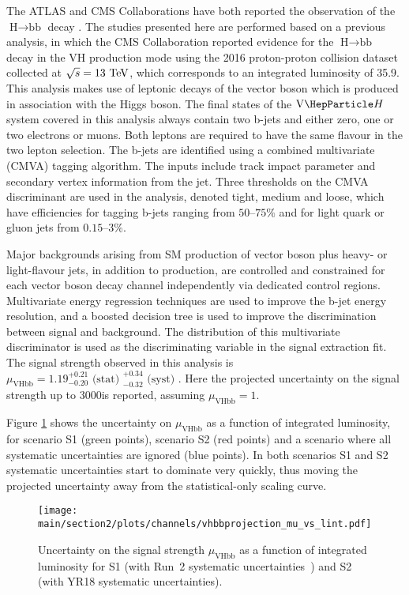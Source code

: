 The ATLAS and CMS Collaborations have both reported the observation of the $\text{H}\to\text{bb}$ decay \cite{Aaboud:2018zhk,Sirunyan:2018kst}.
The studies presented here are performed based on a previous analysis, in which 
the CMS Collaboration reported evidence for the $\text{H}\to\text{bb}$ decay in the $\text{VH}$ production mode using the 2016
proton-proton collision dataset collected at $\sqrt{s} = 13\,\,\text{Te\hspace{-.08em}V}$, which corresponds to an integrated luminosity of 35.9\fbinv \cite{HIG16044}. 
This analysis makes use of leptonic decays of the vector boson which is produced in association with the Higgs boson. The final states
of the $\vh$ system covered in this analysis always contain two b-jets and either zero, one or two electrons or muons. Both leptons are required to have the same flavour in the two lepton selection.
The b-jets are identified using a combined multivariate (CMVA) tagging algorithm. The inputs include track impact parameter and secondary vertex information from the jet. Three thresholds on the CMVA discriminant are used in the analysis, denoted tight, medium and loose, which have efficiencies for tagging b-jets ranging from $50$--$75\%$ and for light quark or gluon jets from $0.15$--$3\%$.

Major backgrounds arising from SM production of vector boson plus heavy- or light-flavour jets, in addition to \ttbar production, are 
controlled and constrained for each vector boson decay channel independently via dedicated control regions. Multivariate energy
regression techniques are used to improve the b-jet energy resolution, and a boosted decision tree is used to improve the discrimination 
between signal and background. The distribution of this multivariate discriminator is used as the discriminating
variable in the signal extraction fit. The signal strength observed in this analysis is 
$\mu_{\text{VHbb}} = 1.19^{+0.21}_{-0.20}\text{ (stat) }^{+0.34}_{-0.32}\text{ (syst) }$. Here the projected uncertainty
on the signal strength up to 3000\fbinv is reported, assuming $\mu_{\text{VHbb}} = 1$.

Figure \ref{fig:vhbb_projection_intlumi} shows the uncertainty on $\mu_{\text{VHbb}}$ as a function
of integrated luminosity, for scenario S1 (green points), scenario S2 (red points) and a scenario
where all systematic uncertainties are ignored (blue points).
In both scenarios
S1 and S2 systematic uncertainties start to dominate very quickly, thus moving the projected 
uncertainty away from the statistical-only scaling curve.

\begin{figure}[h!]
\begin{center}
\texttt{[image: \\main/section2/plots/channels/vhbbprojection\_mu\_vs\_lint.pdf]}
\end{center}
\caption{Uncertainty on the signal strength $\mu_{\text{VHbb}}$ as a function of integrated luminosity for S1 (with Run~2 systematic uncertainties~\cite{HIG16044}) and S2 (with YR18 systematic uncertainties).}
\label{fig:vhbb_projection_intlumi}
\end{figure}

